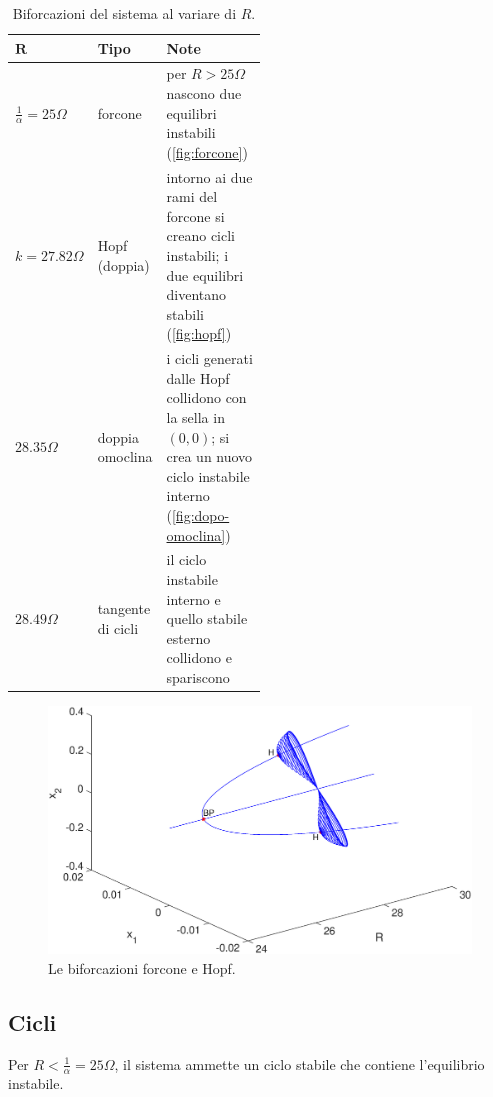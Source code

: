 \begin{enumerate}
\begin{table}
    \centering
    \begin{tabular}{l l p{0.5\linewidth}}
        $\mathbf{R}$ & \textbf{Tipo} & \textbf{Note}\\
        \hline
        $\frac{1}{\alpha} = 25 \Omega$ & forcone & per $R>25 \Omega$ nascono due equilibri instabili (\autoref{fig:forcone}) \\
        \hline
        $k=27.82 \Omega$ & Hopf (doppia) & intorno ai due rami del forcone si creano cicli instabili; i due equilibri diventano stabili (\autoref{fig:hopf}) \\
        \hline
        $28.35 \Omega$ & doppia omoclina & i cicli generati dalle Hopf collidono con la sella in $(0,0)$; si crea un nuovo ciclo instabile interno (\autoref{fig:dopo-omoclina}) \\
        \hline
        $28.49 \Omega$ & tangente di cicli & il ciclo instabile interno e quello stabile esterno collidono e spariscono \\
        \hline
    \end{tabular}
    \caption{Biforcazioni del sistema al variare di $R$.}
    \label{tab:biforc-r}
\end{table}

\begin{figure}
    \centering
    \includegraphics[width=1\textwidth]{matcont/ForconeHopf}
    \caption{Le biforcazioni forcone e Hopf.}
    \label{fig:forcone}
\end{figure}

\subsection{Cicli}
Per $R<\frac{1}{\alpha}=25 \Omega$, il sistema ammette un ciclo stabile che contiene l'equilibrio instabile.


\end{enumerate}
